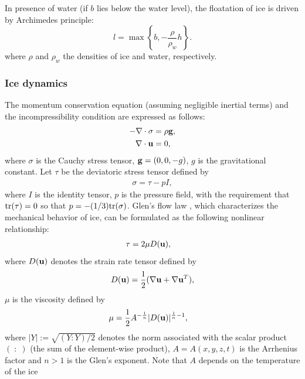 \documentclass[10pt,twocolumn]{article}
\begin{document}
In presence of water (if $b$ lies below the water level), 
the floatation of ice is driven by Archimedes principle:
\begin{equation}
l = \max \left\{ b , - \frac{\rho}{\rho_{w}} h \right\}.
\label{floatation}
\end{equation}
where $\rho$ and $\rho_{w}$ the densities of ice and water, respectively. 
 
\subsubsection{Ice dynamics}
\label{phys_ice_dynamics}
 
The momentum conservation equation (assuming negligible inertial terms) and the 
incompressibility condition are expressed as follows:
\begin{align}
- \nabla \cdot \sigma  & =  \rho  {\bf g},  \label{eq_conservation}  \\
\nabla \cdot {\bf u}  & = 0,                   \label{eq_incomp} 
\end{align}  
where $\sigma$ is the Cauchy stress tensor, ${\bf g}= (0,0,-g)$, $g$ is the gravitational constant.
Let $\tau$ be the deviatoric stress tensor defined by 
\begin{align}
\sigma = \tau  -  p I , \label{eq_dev}  
\end{align}  
where $I$ is the identity tensor, $p$ is the pressure field, 
with the requirement that ${\rm tr} (\tau) = 0 $ so that 
$p = -(1/3) {\rm tr} (\sigma)$. Glen's flow law \citep{Glen1953}, 
which characterizes the mechanical behavior of ice, can be formulated 
as the following nonlinear relationship:
\begin{align} 
\tau & = 2 \mu {D} ({\bf u}), \label{eq_tau} 
\end{align}  
where ${D} ({\bf u})$ denotes the strain rate tensor defined by 
\begin{align} 
{D} ({\bf u}) = \frac12 ( \nabla {\bf u} +  \nabla {\bf u}^T ),
\label{def_varepsilon}  
\end{align} 
$\mu$ is the viscosity defined by 
\begin{align}  
\mu & = \frac12  A^{-\frac{1}{n}} | D ({\bf u}) |^{\frac{1}{n}-1},
\label{eq_mu}  
\end{align} 
where $ |Y|  := \sqrt{(Y : Y) / 2 }$ denotes the norm associated with the scalar product 
$(\; : \;)$ (the sum of the element-wise product), $A=A(x,y,z,t)$ is the Arrhenius factor 
and $n>1$ is the Glen's exponent.
Note that $A$ depends on the temperature of the ice \citep{Paterson1994}
\end{document}
